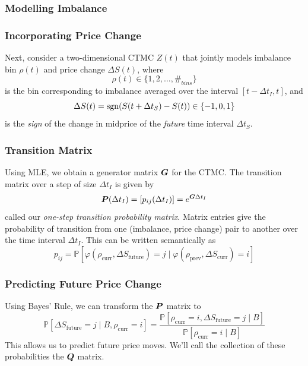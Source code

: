 \begin{frame}
\frametitle{Modelling Imbalance}

\end{frame}

\begin{frame}
\frametitle{Incorporating Price Change}
Next, consider a two-dimensional CTMC $Z(t)$ that jointly models imbalance bin $\rho(t)$ and price change $\Delta S(t)$, where 
\[ \rho(t) \in \lbrace 1,2,\dots,\#_{bins} \rbrace \]
is the bin corresponding to imbalance averaged over the interval $[t-\Delta t_I, t]$, and
\[ \Delta S(t) = \operatorname{\mathrm{sgn}}(S(t+\Delta t_S)-S(t)) \in \lbrace -1, 0, 1 \rbrace \]  
is the \emph{sign} of the change in midprice of the \emph{future} time interval $\Delta t_S$.

\end{frame}

\begin{frame}
\frametitle{Transition Matrix}
Using MLE, we obtain a generator matrix $\boldsymbol{G}$ for the CTMC. The transition matrix over a step of size $\Delta t_I$ is given by
\[ \boldsymbol{P}(\Delta t_I) = [p_{ij}(\Delta t_I)] = e^{\boldsymbol{G} \Delta t_I} \]
called our \emph{one-step transition probability matrix}. Matrix entries give the probability of transition from one (imbalance, price change) pair to another over the time interval $\Delta t_I$. This can be written semantically as
\[ p_{ij} = \mathbb{P}\left[ \varphi( \rho_\text{curr}, \Delta S_\text{future}) = j \; | \; \varphi( \rho_\text{prev}, \Delta S_\text{curr} ) = i \right] \]
\end{frame}

\begin{frame}
\frametitle{Predicting Future Price Change}
Using Bayes' Rule, we can transform the $\boldsymbol{P}$ matrix to 
\[ \mathbb{P}\left[ \Delta S_\text{future} = j \; | \; B, \rho_\text{curr} = i \right] = \dfrac{\mathbb{P}\left[ \rho_\text{curr} = i, \Delta S_\text{future} = j \; | \; B \right]}{\mathbb{P}\left[ \rho_\text{curr} = i \; | \; B \right]} \]
This allows us to predict future price moves.
\vspace{\baselineskip}
We'll call the collection of these probabilities the $\boldsymbol{Q}$ matrix.
\end{frame}

